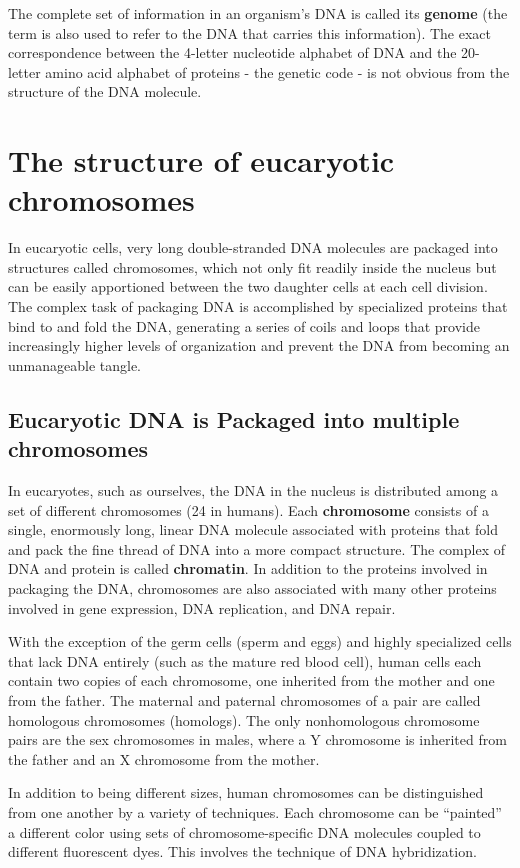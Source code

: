 The complete set of information in an organism’s DNA is called its \textbf{genome}
(the term is also used to refer to the DNA that carries this information).
The exact correspondence between the 4-letter nucleotide alphabet
of DNA and the 20-letter amino acid alphabet of proteins - the genetic
code - is not obvious from the structure of the DNA molecule.

\section{The structure of eucaryotic chromosomes}

In eucaryotic cells, very long double-stranded DNA molecules are packaged
into structures called chromosomes, which not only fit readily inside the
nucleus but can be easily apportioned between the two daughter cells at
each cell division. The complex task of packaging DNA is accomplished
by specialized proteins that bind to and fold the DNA, generating a series
of coils and loops that provide increasingly higher levels of organization
and prevent the DNA from becoming an unmanageable tangle.

\subsection{Eucaryotic DNA is Packaged into multiple chromosomes}

In eucaryotes, such as ourselves, the DNA in the nucleus is distributed
among a set of different chromosomes (24 in humans).
Each \textbf{chromosome} consists of a single, enormously long,
linear DNA molecule associated with proteins that fold and pack the fine
thread of DNA into a more compact structure. The complex of DNA and
protein is called \textbf{chromatin}. In addition to the proteins involved in packaging
the DNA, chromosomes are also associated with many other proteins
involved in gene expression, DNA replication, and DNA repair.

With the exception of the germ cells (sperm and eggs) and highly specialized
cells that lack DNA entirely (such as the mature red blood cell),
human cells each contain two copies of each chromosome, one inherited
from the mother and one from the father. The maternal and paternal
chromosomes of a pair are called homologous chromosomes (homologs).
The only nonhomologous chromosome pairs are the sex chromosomes
in males, where a Y chromosome is inherited from the father and an X
chromosome from the mother.

In addition to being different sizes, human chromosomes can be distinguished
from one another by a variety of techniques. Each chromosome
can be “painted” a different color using sets of chromosome-specific
DNA molecules coupled to different fluorescent dyes. This
involves the technique of DNA hybridization.

